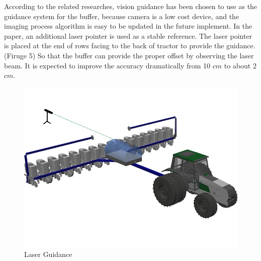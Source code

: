 \documentclass[12pt]{article}
\begin{document}
\begin{flushleft}
According to the related researches, vision guidance has been chosen to use as the guidance system for the buffer, because camera is a low cost device, and the imaging process algorithm is easy to be updated in the future implement. In the paper, an additional laser pointer is used as a stable reference. The laser pointer is placed at the end of rows facing to the back of tractor to provide the guidance. (Firuge 5) So that the buffer can provide the proper offset by observing the laser beam. It is expected to improve the accuracy dramatically from 10 $cm$ to about 2 $cm$. 
\begin{figure}[ht!]
	\begin{center}
		\includegraphics[scale = 0.6]{tractor.jpg}
		\caption{Laser Guidance}
	\end{center}
\end{figure}





\end{flushleft}
\end{document}

